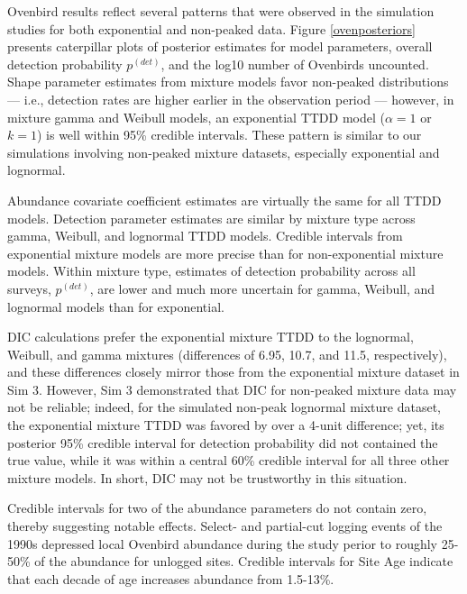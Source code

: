 \documentclass[useAMS,usenatbib,referee,12pt]{article}
\begin{document}
Ovenbird results reflect several patterns that were observed in the simulation studies for both exponential and non-peaked data.  
Figure \ref{ovenposteriors} presents caterpillar plots of posterior estimates for model parameters, overall detection probability $p^{(det)}$, and the log10 number of Ovenbirds uncounted.  
Shape parameter estimates from mixture models favor non-peaked distributions --- i.e., detection rates are higher earlier in the observation period --- however, in mixture gamma and Weibull models, an exponential TTDD model ($\alpha=1$ or $k=1$) is well within 95\% credible intervals.  
These pattern is similar to our simulations involving non-peaked mixture datasets, especially exponential and lognormal.

Abundance covariate coefficient estimates are virtually the same for all TTDD models.  
Detection parameter estimates are similar by mixture type across gamma, Weibull, and lognormal TTDD models.  
Credible intervals from exponential mixture models are more precise than for non-exponential mixture models.  
Within mixture type, estimates of detection probability across all surveys, $p^{(det)}$, are lower and much more uncertain for gamma, Weibull, and lognormal models than for exponential.

DIC calculations prefer the exponential mixture TTDD to the lognormal, Weibull, and gamma mixtures (differences of 6.95, 10.7, and 11.5, respectively), and these differences closely mirror those from the exponential mixture dataset in Sim 3.  
However, Sim 3 demonstrated that DIC for non-peaked mixture data may not be reliable; indeed, for the simulated non-peak lognormal mixture dataset, the exponential mixture TTDD was favored by over a 4-unit difference; yet, its posterior 95\% credible interval for detection probability did not contained the true value, while it was within a central 60\% credible interval for all three other mixture models.  
In short, DIC may not be trustworthy in this situation.

Credible intervals for two of the abundance parameters do not contain zero, thereby suggesting notable effects.  
Select- and partial-cut logging events of the 1990s depressed local Ovenbird abundance during the study perior to roughly 25-50\% of the abundance for unlogged sites.  
Credible intervals for Site Age indicate that each decade of age increases abundance from 1.5-13\%.
\end{document}
